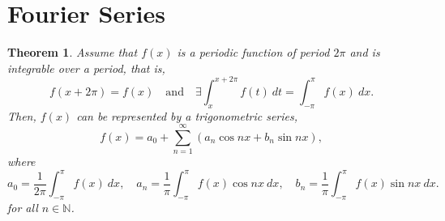 \documentclass[12pt,openany]{book}
\newtheorem{theorem}{Theorem}[chapter]
\theoremstyle{definition}
\newcommand{\N}{\mathbb{N}}
\newcommand{\of}[1]{\left( #1 \right)}
\begin{document}
	\section{Fourier Series}
	\begin{tcolorbox}[colframe=thmcolor, title={\color{white}\bf Fourier Series of a Periodic Function of Period $2\pi$}]
		\begin{theorem}
			Assume that $f(x)$ is a periodic function of period $2\pi$ and is integrable over a period, that is, \[
			f(x+2\pi)=f(x)\quad\text{and}\quad\exists\int_x^{x+2\pi}f(t)\ dt=\int_{-\pi}^{\pi}f(x)\ dx.
			\] Then, $f(x)$ can be represented by a trigonometric series, \[
			f(x)=a_0+\sum_{n=1}^\infty\of{a_n\cos nx+b_n\sin nx},
			\] where \[
			a_0=\frac{1}{2\pi}\int_{-\pi}^{\pi}f(x)\ dx,\quad a_n=\frac{1}{\pi}\int_{-\pi}^{\pi}f(x)\cos nx\ dx,\quad b_n=\frac{1}{\pi}\int_{-\pi}^{\pi}f(x)\sin nx\ dx.
			\] for all $n\in\N$.
		\end{theorem}
	\end{tcolorbox}
\end{document}
